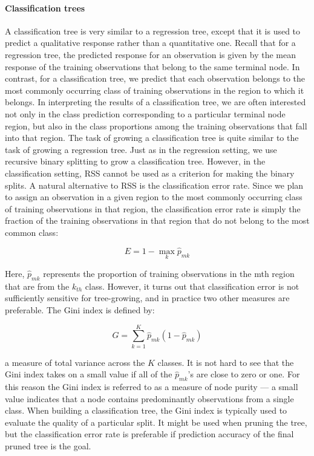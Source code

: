 \paragraph{Classification trees}
A classification tree is very similar to a regression tree, except that it is used to predict a
qualitative response rather than a quantitative one. Recall that for a regression tree, the
predicted response for an observation is given by the mean response of the training observations
that belong to the same terminal node. In contrast, for a classification tree, we predict that each
observation belongs to the most commonly occurring class of training observations in the region to
which it belongs. In interpreting the results of a classification tree, we are often interested not
only in the class prediction corresponding to a particular terminal node region, but also in the
class proportions among the training observations that fall into that region. The task of growing a
classification tree is quite similar to the task of growing a regression tree. Just as in the
regression setting, we use recursive binary splitting to grow a classification tree. However, in the
classification setting, RSS cannot be used as a criterion for making the binary splits. A natural
alternative to RSS is the classification error rate. Since we plan to assign an observation in a
given region to the most commonly occurring class of training observations in that region, the
classification error rate is simply the fraction of the training observations in that region that do
not belong to the most common class:

$$E = 1 - \max_k{\hat{p}_{mk}}$$

Here, $\hat{p}_{mk}$ represents the proportion of training observations in the mth region that are
from the $k_{th}$ class. However, it turns out that classification error is not sufficiently
sensitive for tree-growing, and in practice two other measures are preferable. The Gini index is
defined by:

$$G = \sum_{k=1}^{K} \hat{p}_{mk}(1-\hat{p}_{mk})$$

a measure of total variance across the $K$ classes. It is not hard to see that the Gini index takes
on a small value if all of the $\hat{p}_{mk}$’s are close to zero or one. For this reason the Gini
index is referred to as a measure of node purity --- a small value indicates that a node contains
predominantly observations from a single class. When building a classification tree, the Gini index
is typically used to evaluate the quality of a particular split. It might be used when pruning the
tree, but the classification error rate is preferable if prediction accuracy of the final pruned
tree is the goal.


